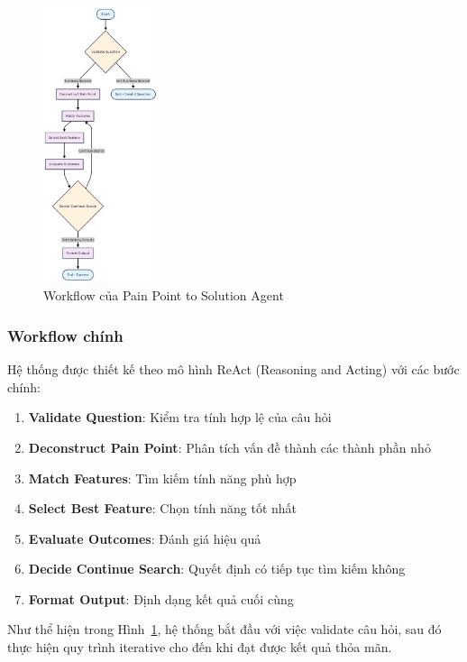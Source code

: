 \documentclass[12pt,a4paper]{article}
\begin{document}
\begin{figure}[h]
    \centering
    \includegraphics[width=0.3\textwidth]{Flow.png}
    \caption{Workflow của Pain Point to Solution Agent}
    \label{fig:workflow}
\end{figure}
\newpage
\subsubsection{Workflow chính}
Hệ thống được thiết kế theo mô hình ReAct (Reasoning and Acting) với các bước chính:

\begin{enumerate}[label=\textbf{\arabic*.}]
    \item \textbf{Validate Question}: Kiểm tra tính hợp lệ của câu hỏi
    \item \textbf{Deconstruct Pain Point}: Phân tích vấn đề thành các thành phần nhỏ
    \item \textbf{Match Features}: Tìm kiếm tính năng phù hợp
    \item \textbf{Select Best Feature}: Chọn tính năng tốt nhất
    \item \textbf{Evaluate Outcomes}: Đánh giá hiệu quả
    \item \textbf{Decide Continue Search}: Quyết định có tiếp tục tìm kiếm không
    \item \textbf{Format Output}: Định dạng kết quả cuối cùng
\end{enumerate}

Như thể hiện trong Hình~\ref{fig:workflow}, hệ thống bắt đầu với việc validate câu hỏi, sau đó thực hiện quy trình iterative cho đến khi đạt được kết quả thỏa mãn.
\end{document}
